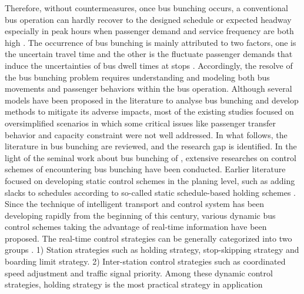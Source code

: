 \documentclass[smallextended]{svjour3}       %
\begin{document}
\begin{Abstract}
Therefore, without countermeasures, once bus bunching occurs, a conventional bus operation can hardly recover to the designed schedule or expected headway especially in peak hours when passenger demand and service frequency are both high \citep{1964Nwell,2001Hickman,2009Daganzo}.
The occurrence of bus bunching is mainly attributed to two factors, one is the uncertain travel time and the other is the fluctuate passenger demands that induce the uncertainties of bus dwell times at stops \citep{2015Fonzone}.
Accordingly, the resolve of the bus bunching problem requires understanding and modeling both bus movements and passenger behaviors within the bus operation.
Although several models have been proposed in the literature to analyse bus bunching and develop methods to  mitigate its adverse impacts, most of the existing studies focused on oversimplified scenarios in which some critical issues like passenger transfer behavior and capacity constraint were not well addressed.
In what follows, the literature in bus bunching are reviewed, and the research gap is identified.
In the light of the seminal work about bus bunching of \cite{1964Nwell}, 
extensive researches on control schemes of encountering bus bunching have been conducted.
Earlier literature focused on developing static control schemes in the planing level, 
such as adding slacks to schedules according to so-called static schedule-based holding schemes 
\citep{1989Abkowitz,2001Eberlein}.%
Since the technique of intelligent transport and control system has been developing rapidly from the beginning of this century, various dynamic bus control schemes taking the advantage of real-time information have been proposed.
The real-time control strategies can be generally categorized into two groups \citep{2015Ibarra-Rojas}.
1) Station strategies such as holding strategy, stop-skipping strategy and boarding limit strategy.
2) Inter-station control strategies such as coordinated speed adjustment and traffic signal priority.
Among these dynamic control strategies, holding strategy is the most practical strategy in application \citep{2013Cats,2001Eberlein}

\end{Abstract}
\end{document}
